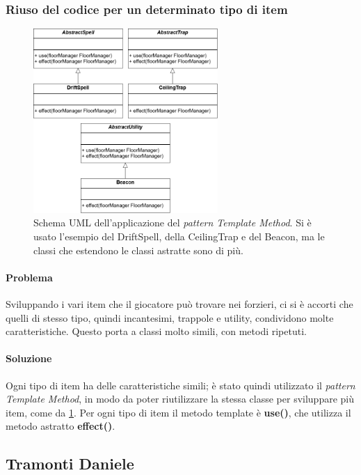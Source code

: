 \documentclass{report}
\begin{document}
\subsubsection{Riuso del codice per un determinato tipo di item}

\begin{figure}
    \centering
    \includegraphics[width=7cm]{patternTemplateItem.drawio.png}
    \caption{Schema UML dell'applicazione del \textit{pattern Template Method}. Si è usato l'esempio del DriftSpell, della CeilingTrap e del Beacon, ma le classi che estendono le classi astratte sono di più.}
    \label{img:templateItem}
\end{figure}

\paragraph{Problema} Sviluppando i vari item che il giocatore può trovare nei forzieri, ci si è accorti che quelli di stesso tipo, quindi incantesimi, trappole e utility, condividono molte caratteristiche.
%
Questo porta a classi molto simili, con metodi ripetuti. 

\paragraph{Soluzione} Ogni tipo di item ha delle caratteristiche simili; è stato quindi utilizzato il \textit{pattern Template Method}, in modo da poter riutilizzare la stessa classe per sviluppare più item, come da \ref{img:templateItem}.
%
Per ogni tipo di item il metodo template è \textbf{use()}, che utilizza il metodo astratto \textbf{effect()}. 

\clearpage
\subsection{Tramonti Daniele}
\end{document}
